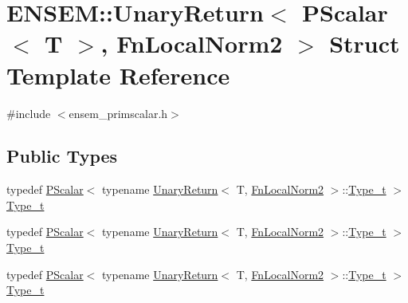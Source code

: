 \hypertarget{structENSEM_1_1UnaryReturn_3_01PScalar_3_01T_01_4_00_01FnLocalNorm2_01_4}{}\section{E\+N\+S\+EM\+:\+:Unary\+Return$<$ P\+Scalar$<$ T $>$, Fn\+Local\+Norm2 $>$ Struct Template Reference}
\label{structENSEM_1_1UnaryReturn_3_01PScalar_3_01T_01_4_00_01FnLocalNorm2_01_4}


{\ttfamily \#include $<$ensem\+\_\+primscalar.\+h$>$}

\subsection*{Public Types}
\begin{DoxyCompactItemize}
\item 
typedef \mbox{\hyperlink{classENSEM_1_1PScalar}{P\+Scalar}}$<$ typename \mbox{\hyperlink{structENSEM_1_1UnaryReturn}{Unary\+Return}}$<$ T, \mbox{\hyperlink{structENSEM_1_1FnLocalNorm2}{Fn\+Local\+Norm2}} $>$\+::\mbox{\hyperlink{structENSEM_1_1UnaryReturn_3_01PScalar_3_01T_01_4_00_01FnLocalNorm2_01_4_a852277c387f03da96f75945baafceac6}{Type\+\_\+t}} $>$ \mbox{\hyperlink{structENSEM_1_1UnaryReturn_3_01PScalar_3_01T_01_4_00_01FnLocalNorm2_01_4_a852277c387f03da96f75945baafceac6}{Type\+\_\+t}}
\item 
typedef \mbox{\hyperlink{classENSEM_1_1PScalar}{P\+Scalar}}$<$ typename \mbox{\hyperlink{structENSEM_1_1UnaryReturn}{Unary\+Return}}$<$ T, \mbox{\hyperlink{structENSEM_1_1FnLocalNorm2}{Fn\+Local\+Norm2}} $>$\+::\mbox{\hyperlink{structENSEM_1_1UnaryReturn_3_01PScalar_3_01T_01_4_00_01FnLocalNorm2_01_4_a852277c387f03da96f75945baafceac6}{Type\+\_\+t}} $>$ \mbox{\hyperlink{structENSEM_1_1UnaryReturn_3_01PScalar_3_01T_01_4_00_01FnLocalNorm2_01_4_a852277c387f03da96f75945baafceac6}{Type\+\_\+t}}
\item 
typedef \mbox{\hyperlink{classENSEM_1_1PScalar}{P\+Scalar}}$<$ typename \mbox{\hyperlink{structENSEM_1_1UnaryReturn}{Unary\+Return}}$<$ T, \mbox{\hyperlink{structENSEM_1_1FnLocalNorm2}{Fn\+Local\+Norm2}} $>$\+::\mbox{\hyperlink{structENSEM_1_1UnaryReturn_3_01PScalar_3_01T_01_4_00_01FnLocalNorm2_01_4_a852277c387f03da96f75945baafceac6}{Type\+\_\+t}} $>$ \mbox{\hyperlink{structENSEM_1_1UnaryReturn_3_01PScalar_3_01T_01_4_00_01FnLocalNorm2_01_4_a852277c387f03da96f75945baafceac6}{Type\+\_\+t}}
\end{DoxyCompactItemize}


